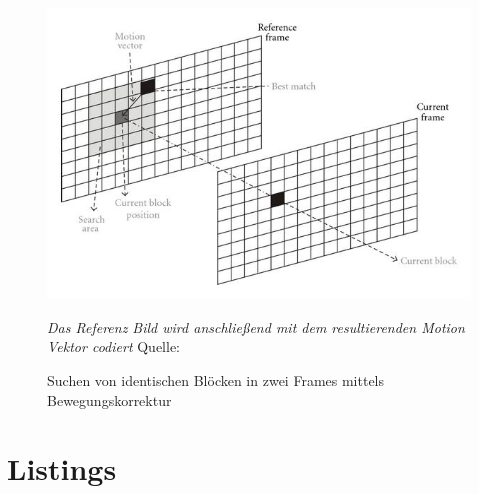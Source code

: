 \begin{figure}[h!]
    \centering
    \includegraphics[scale=3]{images/3-2-3_motionCompensation.jpg}
    \caption{Suchen von identischen Blöcken in zwei Frames mittels Bewegungskorrektur}
    \textit{Das Referenz Bild wird anschließend mit dem resultierenden Motion Vektor codiert}
    Quelle: \cite{lopes_memory_2012}
\end{figure}

\chapter{Listings}


\newpage



